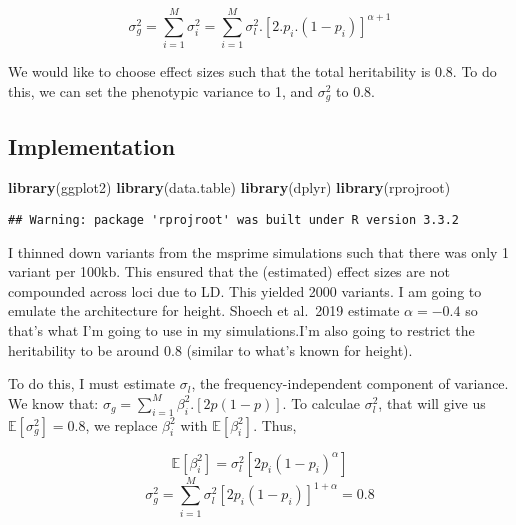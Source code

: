 \documentclass[]{article}
\newenvironment{Shaded}{\begin{snugshade}}{\end{snugshade}}
\newcommand{\KeywordTok}[1]{\textcolor[rgb]{0.13,0.29,0.53}{\textbf{#1}}}
\newcommand{\NormalTok}[1]{#1}
\newcommand{\OperatorTok}[1]{\textcolor[rgb]{0.81,0.36,0.00}{\textbf{#1}}}
\begin{document}
\[\sigma_{g}^2 = \sum_{i=1}^M\sigma_{i}^2= \sum_{i=1}^M\sigma^2_{l}.[2.p_i.(1-p_i)]^{\alpha+1}\]

We would like to choose effect sizes such that the total heritability is
0.8. To do this, we can set the phenotypic variance to 1, and
\(\sigma_g^2\) to 0.8.

\hypertarget{implementation}{%
\subsection{Implementation}\label{implementation}}

\begin{Shaded}
\begin{Highlighting}[]
\KeywordTok{library}\NormalTok{(ggplot2)}
\KeywordTok{library}\NormalTok{(data.table)}
\KeywordTok{library}\NormalTok{(dplyr)}
\KeywordTok{library}\NormalTok{(rprojroot)}
\end{Highlighting}
\end{Shaded}

\begin{verbatim}
## Warning: package 'rprojroot' was built under R version 3.3.2
\end{verbatim}

\begin{Shaded}
\end{Shaded}

I thinned down variants from the msprime simulations such that there was
only 1 variant per 100kb. This ensured that the (estimated) effect sizes
are not compounded across loci due to LD. This yielded 2000 variants. I
am going to emulate the architecture for height. Shoech et al.~2019
estimate \(\alpha = -0.4\) so that's what I'm going to use in my
simulations.I'm also going to restrict the heritability to be around 0.8
(similar to what's known for height).

To do this, I must estimate \(\sigma_l\), the frequency-independent
component of variance. We know that:
\(\sigma_{g} = \sum_{i=1}^M \beta^2_i.[2p(1-p)]\). To calculae
\(\sigma^2_l\), that will give us \(\mathbb{E}[\sigma_{g}^2] = 0.8\), we
replace \(\beta_i^2\) with \(\mathbb{E}[\beta^2_i]\). Thus,

\[\mathbb{E}[\beta^2_i] = \sigma^2_l[2p_i(1-p_i)^{\alpha}]\]
\[\sigma_g^2 = \sum_{i=1}^M \sigma_l^2[2p_i(1-p_i)]^{1+\alpha} = 0.8\]
\end{document}
